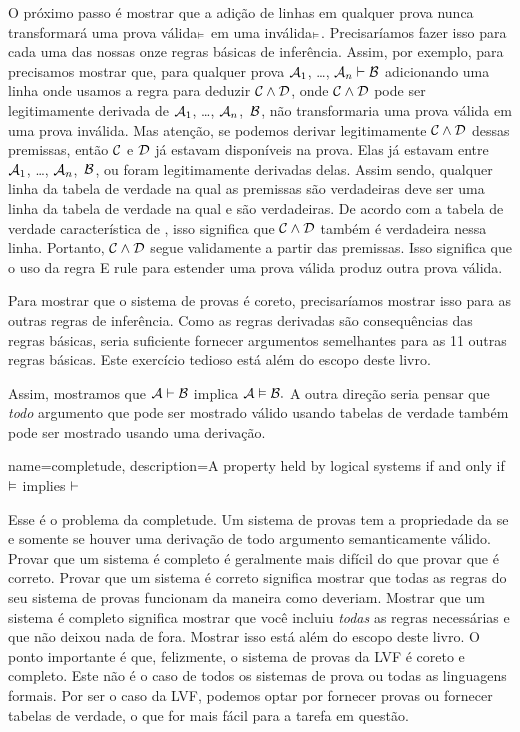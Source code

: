 O pr\'oximo passo \'e mostrar que a adi\c c\~ao de linhas em qualquer prova nunca transformar\'a uma prova v\'alida$_{\vDash}$ em uma inv\'alida$_{\vDash}$. Precisar\'iamos fazer isso para cada uma das nossas onze regras b\'asicas de infer\^encia. Assim, por exemplo, para   precisamos mostrar que, para qualquer prova $\mathcal{A}_{1}$, \dots, $\mathcal{A}_{n} \vdash  \mathcal{B}$ adicionando uma linha onde usamos a  regra  para deduzir $\mathcal{C} \wedge \mathcal{D}$, onde $\mathcal{C} \wedge \mathcal{D}$ pode ser legitimamente derivada de $\mathcal{A}_{1}$, \dots, $\mathcal{A}_{n}$,~$\mathcal{B}$,  n\~ao transformaria uma prova v\'alida em uma prova inv\'alida. Mas aten\c c\~ao, se podemos derivar legitimamente $\mathcal{C} \wedge \mathcal{D}$ dessas premissas, ent\~ao $\mathcal{C}$ e $\mathcal{D}$  j\'a estavam dispon\'iveis na prova. Elas j\'a estavam entre $\mathcal{A}_{1}$, \dots, $\mathcal{A}_{n}$,~$\mathcal{B}$, ou foram legitimamente derivadas delas.  Assim sendo, qualquer linha da tabela  de verdade na qual as premissas s\~ao verdadeiras deve ser uma linha da tabela de verdade na qual  e  s\~ao verdadeiras. De acordo com a tabela de verdade caracter\'istica de \eand, isso significa que $\mathcal{C} \wedge \mathcal{D}$ tamb\'em \'e verdadeira nessa linha. Portanto,  $\mathcal{C} \wedge \mathcal{D}$ segue validamente a partir das premissas. Isso significa que o uso da regra {\eand}E rule para estender uma prova v\'alida produz outra prova v\'alida.


Para mostrar que o sistema de provas \'e coreto, precisar\'iamos mostrar isso para as outras regras de infer\^encia. Como as regras derivadas s\~ao consequ\^encias das regras b\'asicas, seria suficiente fornecer argumentos semelhantes para as 11 outras regras b\'asicas. Este exerc\'icio tedioso est\'a al\'em do escopo deste livro.


Assim, mostramos que $\mathcal{A} \vdash  \mathcal{B}$ implica $\mathcal{A} \vDash \mathcal{B}.$ A outra dire\c c\~ao seria pensar que \emph{todo} argumento que pode ser mostrado v\'alido usando tabelas de verdade tamb\'em pode ser mostrado usando uma deriva\c c\~ao.

{
name=completude,
description={A property held by logical systems if and only if $\vDash $ implies $\vdash $}
}

Esse \'e o problema da completude. Um sistema de provas tem a propriedade da    \label{def:completeness} se e somente se houver uma deriva\c c\~ao de todo argumento semanticamente v\'alido. Provar que um sistema \'e completo \'e geralmente mais dif\'icil do que provar que \'e correto. Provar que um sistema \'e correto significa mostrar que todas as regras do seu sistema de provas funcionam da maneira como deveriam.
Mostrar que um sistema \'e completo significa mostrar que voc\^e incluiu \emph{todas} as regras necess\'arias e que n\~ao deixou nada de fora. Mostrar isso est\'a al\'em do escopo deste livro. O ponto importante \'e que, felizmente, o sistema de provas da LVF \'e coreto e completo. Este n\~ao \'e o caso de todos os sistemas de prova ou todas as linguagens formais. Por ser o caso da LVF, podemos optar por fornecer provas ou fornecer tabelas de verdade, o que for mais f\'acil para a tarefa em quest\~ao.

